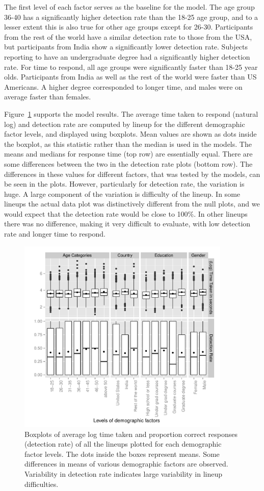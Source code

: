 \documentclass[10pt]{article}\usepackage[]{graphicx}\usepackage[]{xcolor}
\begin{document}
The first level of each factor serves as the baseline for the model. The age group 36-40  has a significantly higher detection rate than the 18-25 age group, and to a lesser extent this is also true for other age groups except for 26-30. Participants from the rest of the world have a similar detection rate to those from the USA, but participants from India show a significantly lower detection rate. Subjects reporting to have  an undergraduate degree had a significantly higher detection rate. For time to respond, all age groups were significantly faster than  18-25 year olds.  Participants from India as well as the rest of the world were faster than US Americans. A higher degree corresponded to longer time, and males were on average faster than females.


Figure~\ref{fig:demographic_effect} supports the model results. The average time taken to respond (natural log) and detection rate are computed by lineup for the different demographic factor levels, and displayed using boxplots. Mean values are shown as dots inside the boxplot, as this statistic rather than the median is used in the models. The means and medians for response time (top row) are essentially equal. There are some differences between the two in the detection rate plots (bottom row). The differences in these values for different factors, that was tested by the models, can be seen in the plots. However, particularly for detection rate, the variation is huge. A large component of the variation is difficulty of the lineup. In some lineups the actual data plot was distinctively different from the null plots, and we would expect that the detection rate would be close to 100\%. In other lineups there was no difference, making it very difficult to evaluate, with low detection rate and longer time to respond. 

\begin{figure}[htbp] 
   \centering
   \includegraphics[width=4in]{demographic_effect.pdf} 
   \caption{Boxplots of average log time taken and proportion correct responses (detection rate) of all the lineups plotted for each demographic factor levels. The dots inside the boxes represent means. Some differences in means of various demographic factors are observed. Variability in detection rate indicates large variability in lineup difficulties. }
   \label{fig:demographic_effect}
\end{figure}
\end{document}
